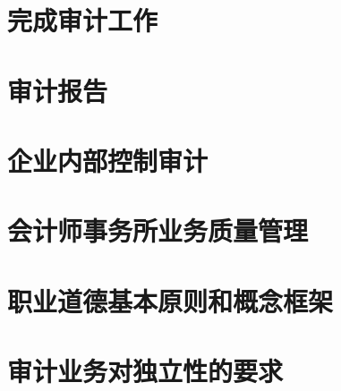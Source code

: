 \documentclass[UTF8,12pt]{ctexart}
\numberwithin{equation}{section} %
\numberwithin{figure}{section}
\numberwithin{table}{section}
\begin{document}
	\newpage
	\section{完成审计工作}
	
	\newpage
	\section{审计报告}
	
	\newpage
	\section{企业内部控制审计}
	
	\newpage
	\section{会计师事务所业务质量管理}
	
	\newpage
	\section{职业道德基本原则和概念框架}
	
	\newpage
	\section{审计业务对独立性的要求}
	

	

	
\end{document}
